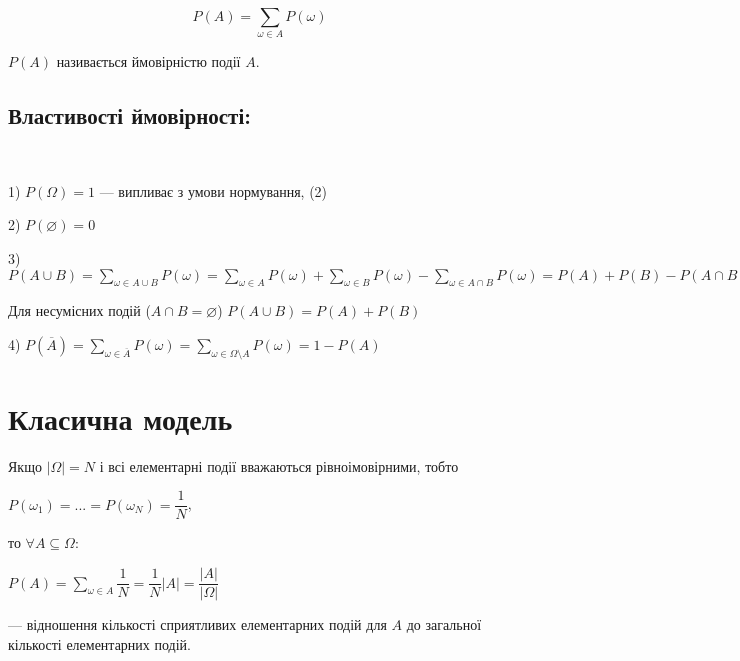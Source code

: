 $$P(A) = \sum\limits_{\omega \in A} P(\omega)$$

$P(A)$ називається ймовірністю події $A$.

\subsection*{Властивості ймовірності:}~

1) $P(\Omega) = 1$ --- випливає з умови нормування, (2)

2) $P(\varnothing) = 0$

3) $P(A \cup B)
= \sum\limits_{\omega \in A \cup B} P(\omega)
= \sum\limits_{\omega \in A} P(\omega)
    + \sum\limits_{\omega \in B} P(\omega)
    - \sum\limits_{\omega \in A \cap B} P(\omega)
= P(A) + P(B) - P(A \cap B)$

Для несумісних подій ($A \cap B = \varnothing$)
$P(A \cup B) = P(A) + P(B)$

4) $P(\overline{A})
= \sum\limits_{\omega \in \overline{A}} P(\omega)
= \sum\limits_{\omega \in \Omega \setminus A} P(\omega)
= 1 - P(A)$

\section{Класична модель}

Якщо $|\Omega| = N$ і всі елементарні події вважаються
рівноімовірними, тобто

$P(\omega_1) = ... = P(\omega_N) = \dfrac{1}{N}$,

то $\forall A \subseteq \Omega$:

$P(A)
= \sum\limits_{\omega \in A} \dfrac{1}{N}
= \dfrac{1}{N} |A|
= \dfrac{|A|}{|\Omega|}$

--- відношення кількості сприятливих елементарних подій для
$A$ до загальної кількості елементарних подій.

